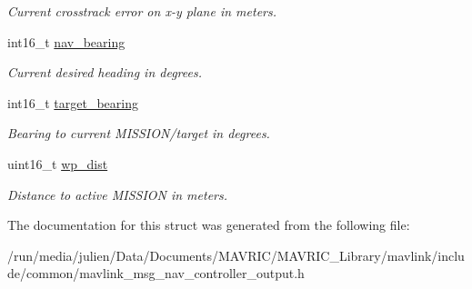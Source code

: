\begin{DoxyCompactItemize}
\begin{DoxyCompactList}\small\item\em Current crosstrack error on x-\/y plane in meters. \end{DoxyCompactList}\item 
\hypertarget{struct____mavlink__nav__controller__output__t_ae18c3d9716a9ec77450d9acf03ea1f64}{int16\+\_\+t \hyperlink{struct____mavlink__nav__controller__output__t_ae18c3d9716a9ec77450d9acf03ea1f64}{nav\+\_\+bearing}}\label{struct____mavlink__nav__controller__output__t_ae18c3d9716a9ec77450d9acf03ea1f64}

\begin{DoxyCompactList}\small\item\em Current desired heading in degrees. \end{DoxyCompactList}\item 
\hypertarget{struct____mavlink__nav__controller__output__t_a4601945c2201a6dcaca7acc5154e087e}{int16\+\_\+t \hyperlink{struct____mavlink__nav__controller__output__t_a4601945c2201a6dcaca7acc5154e087e}{target\+\_\+bearing}}\label{struct____mavlink__nav__controller__output__t_a4601945c2201a6dcaca7acc5154e087e}

\begin{DoxyCompactList}\small\item\em Bearing to current M\+I\+S\+S\+I\+O\+N/target in degrees. \end{DoxyCompactList}\item 
\hypertarget{struct____mavlink__nav__controller__output__t_aa7d7186c64fdd4cf8a0ace5bd2a071f1}{uint16\+\_\+t \hyperlink{struct____mavlink__nav__controller__output__t_aa7d7186c64fdd4cf8a0ace5bd2a071f1}{wp\+\_\+dist}}\label{struct____mavlink__nav__controller__output__t_aa7d7186c64fdd4cf8a0ace5bd2a071f1}

\begin{DoxyCompactList}\small\item\em Distance to active M\+I\+S\+S\+I\+O\+N in meters. \end{DoxyCompactList}\end{DoxyCompactItemize}


The documentation for this struct was generated from the following file\+:\begin{DoxyCompactItemize}
\item 
/run/media/julien/\+Data/\+Documents/\+M\+A\+V\+R\+I\+C/\+M\+A\+V\+R\+I\+C\+\_\+\+Library/mavlink/include/common/mavlink\+\_\+msg\+\_\+nav\+\_\+controller\+\_\+output.\+h\end{DoxyCompactItemize}

